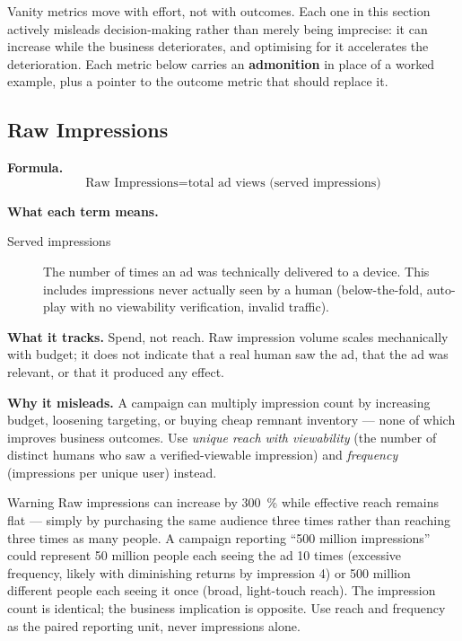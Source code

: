 Vanity metrics move with effort, not with outcomes. Each one in this section actively
misleads decision-making rather than merely being imprecise: it can increase while the
business deteriorates, and optimising for it accelerates the deterioration. Each metric
below carries an \textbf{admonition} in place of a worked example, plus a pointer to the
outcome metric that should replace it.

\subsection{Raw Impressions}

\textbf{Formula.}
\[
  \text{Raw Impressions} = \text{total ad views (served impressions)}
\]

\textbf{What each term means.}
\begin{description}
  \item[Served impressions] The number of times an ad was technically delivered to a device.
    This includes impressions never actually seen by a human (below-the-fold, auto-play
    with no viewability verification, invalid traffic).
\end{description}

\textbf{What it tracks.} Spend, not reach. Raw impression volume scales mechanically with
budget; it does not indicate that a real human saw the ad, that the ad was relevant, or that
it produced any effect.

\textbf{Why it misleads.} A campaign can multiply impression count by increasing budget,
loosening targeting, or buying cheap remnant inventory --- none of which improves business
outcomes. Use \emph{unique reach with viewability} (the number of distinct humans who saw a
verified-viewable impression) and \emph{frequency} (impressions per unique user) instead.

\begin{admonition}{Warning}
Raw impressions can increase by \qty{300}{\percent} while effective reach remains flat ---
simply by purchasing the same audience three times rather than reaching three times as many
people. A campaign reporting ``500 million impressions'' could represent 50 million people
each seeing the ad 10 times (excessive frequency, likely with diminishing returns by
impression 4) or 500 million different people each seeing it once (broad, light-touch
reach). The impression count is identical; the business implication is opposite.
Use reach and frequency as the paired reporting unit, never impressions alone.
\end{admonition}


